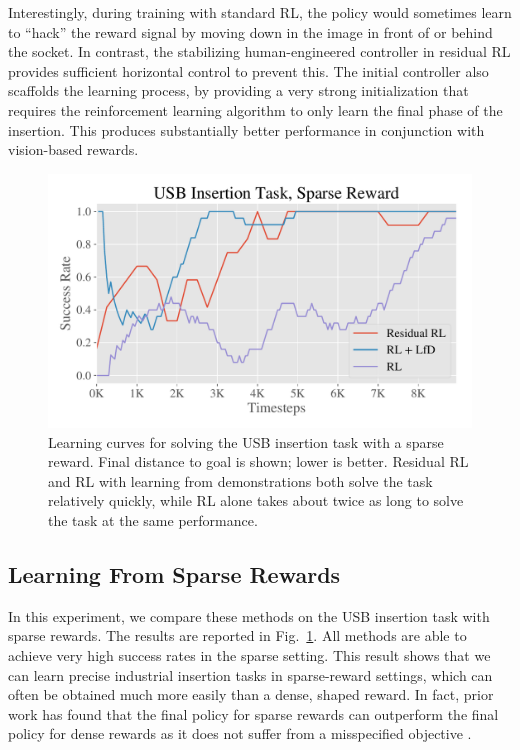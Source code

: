 Interestingly, during training with standard RL, the policy would sometimes learn to ``hack'' the reward signal by moving down in the image in front of or behind the socket. In contrast, the stabilizing human-engineered controller in residual RL provides sufficient horizontal control to prevent this. The initial controller also scaffolds the learning process, by providing a very strong initialization that requires the reinforcement learning algorithm to only learn the final phase of the insertion. This produces substantially better performance in conjunction with vision-based rewards.

\begin{figure}
    \centering
        \includegraphics[width=0.99\linewidth]{insertion/newfigs/Sparse_success_all.pdf}
    \caption{Learning curves for solving the USB insertion task with a sparse reward. Final distance to goal is shown; lower is better. Residual RL and RL with learning from demonstrations both solve the task relatively quickly, while RL alone takes about twice as long to solve the task at the same performance. }
    \label{fig:SparseRewardsAll}
    \vspace{-1.0cm}
\end{figure}

\subsection{Learning From Sparse Rewards}

In this experiment, we compare these methods on the USB insertion task with sparse rewards. The results are reported in Fig.~\ref{fig:SparseRewardsAll}. All methods are able to achieve very high success rates in the sparse setting. 
This result shows that we can learn precise industrial insertion tasks in sparse-reward settings, which can often be obtained much more easily than a dense, shaped reward. 
In fact, prior work has found that the final policy for sparse rewards can outperform the final policy for dense rewards as it does not suffer from a misspecified objective \cite{andrychowicz2017her}.

